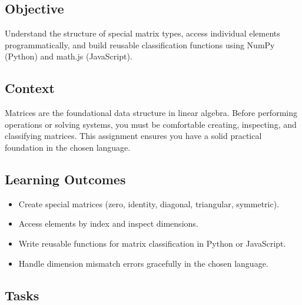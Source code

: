 \documentclass[a4paper,11pt]{article}
\begin{document}
\subsection{Objective}

Understand the structure of special matrix types, access individual elements programmatically, and build reusable classification functions using NumPy (Python) and math.js (JavaScript).

\subsection{Context}

Matrices are the foundational data structure in linear algebra. Before performing operations or solving systems, you must be comfortable creating, inspecting, and classifying matrices. This assignment ensures you have a solid practical foundation in the chosen language.

\subsection{Learning Outcomes}

\begin{itemize}[leftmargin=*]
  \item Create special matrices (zero, identity, diagonal, triangular, symmetric).
  \item Access elements by index and inspect dimensions.
  \item Write reusable functions for matrix classification in Python or JavaScript.
  \item Handle dimension mismatch errors gracefully in the chosen language.
\end{itemize}

\subsection{Tasks}
\end{document}
